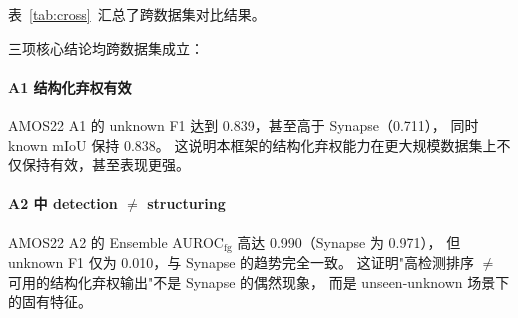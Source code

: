 \documentclass[3p,twocolumn,authoryear]{elsarticle}
\begin{document}
表~\ref{tab:cross}~汇总了跨数据集对比结果。

\begin{table}[!t]
\centering
\caption{Synapse 与 AMOS22 的跨数据集对比。
三项核心结论在两个独立数据集上均保持一致。表中的 \texttt{---} 表示该指标在该设定下不适用或未报告。}\label{tab:cross}
\footnotesize
{}
\end{table}

三项核心结论均跨数据集成立：

\paragraph{A1 结构化弃权有效}
AMOS22 A1 的 unknown F1 达到 0.839，甚至高于 Synapse（0.711），
同时 known mIoU 保持 0.838。
这说明本框架的结构化弃权能力在更大规模数据集上不仅保持有效，甚至表现更强。

\paragraph{A2 中 detection $\neq$ structuring}
AMOS22 A2 的 Ensemble AUROC$_{\text{fg}}$ 高达 0.990（Synapse 为 0.971），
但 unknown F1 仅为 0.010，与 Synapse 的趋势完全一致。
这证明"高检测排序 $\neq$ 可用的结构化弃权输出"不是 Synapse 的偶然现象，
而是 unseen-unknown 场景下的固有特征。
\end{document}
